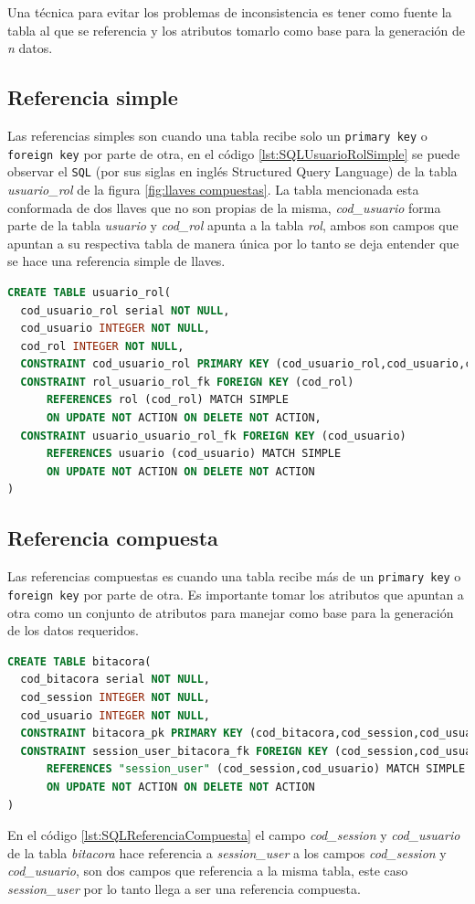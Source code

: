 Una t\'ecnica para evitar los problemas de inconsistencia es tener como fuente la tabla al que se referencia y los atributos  tomarlo como base para la generaci\'on de \emph{n} datos.
\subsection{Referencia simple}
Las referencias simples son cuando una tabla recibe solo un \texttt{primary key} o \texttt{foreign key} por parte de otra, en el c\'odigo \ref{lst:SQLUsuarioRolSimple} se puede observar el  \texttt{SQL} (por sus siglas en ingl\'es Structured Query Language) de la tabla \textit{usuario\_rol} de la figura \ref{fig:llaves compuestas}.  La tabla mencionada esta conformada de dos llaves que no son propias de la misma, \textit{cod\_usuario} forma parte de la tabla \textit{usuario} y \textit{cod\_rol} apunta a la tabla \textit{rol}, ambos son campos que apuntan a su respectiva tabla de manera \'unica por lo tanto se deja entender que se hace una referencia simple de llaves.
\begin{lstlisting}[caption={Referencia simple},label={lst:SQLUsuarioRolSimple},language=sql]
CREATE TABLE usuario_rol(
  cod_usuario_rol serial NOT NULL,
  cod_usuario INTEGER NOT NULL,
  cod_rol INTEGER NOT NULL,
  CONSTRAINT cod_usuario_rol PRIMARY KEY (cod_usuario_rol,cod_usuario,cod_rol),
  CONSTRAINT rol_usuario_rol_fk FOREIGN KEY (cod_rol)
      REFERENCES rol (cod_rol) MATCH SIMPLE
      ON UPDATE NOT ACTION ON DELETE NOT ACTION,
  CONSTRAINT usuario_usuario_rol_fk FOREIGN KEY (cod_usuario)
      REFERENCES usuario (cod_usuario) MATCH SIMPLE
      ON UPDATE NOT ACTION ON DELETE NOT ACTION
)
\end{lstlisting}
\subsection{Referencia compuesta}
Las referencias compuestas es cuando una tabla recibe m\'as de un \texttt{primary key} o \texttt{foreign key} por parte de otra. Es importante tomar los atributos que apuntan a otra como un conjunto de atributos para manejar como base para la generaci\'on de los datos requeridos.
\begin{lstlisting}[caption={Referencia compuesta},label={lst:SQLReferenciaCompuesta},language=sql]
CREATE TABLE bitacora(
  cod_bitacora serial NOT NULL,
  cod_session INTEGER NOT NULL,
  cod_usuario INTEGER NOT NULL,	  
  CONSTRAINT bitacora_pk PRIMARY KEY (cod_bitacora,cod_session,cod_usuario),
  CONSTRAINT session_user_bitacora_fk FOREIGN KEY (cod_session,cod_usuario)
      REFERENCES "session_user" (cod_session,cod_usuario) MATCH SIMPLE
      ON UPDATE NOT ACTION ON DELETE NOT ACTION
)
\end{lstlisting}
En el c\'odigo \ref{lst:SQLReferenciaCompuesta} el campo \textit{cod\_session} y \textit{cod\_usuario} de la tabla \textit{bitacora} hace referencia a \textit{session\_user} a los campos \textit{cod\_session} y \textit{cod\_usuario}, son dos campos que referencia a la misma tabla, este caso \textit{session\_user} por lo tanto llega a ser una referencia compuesta.